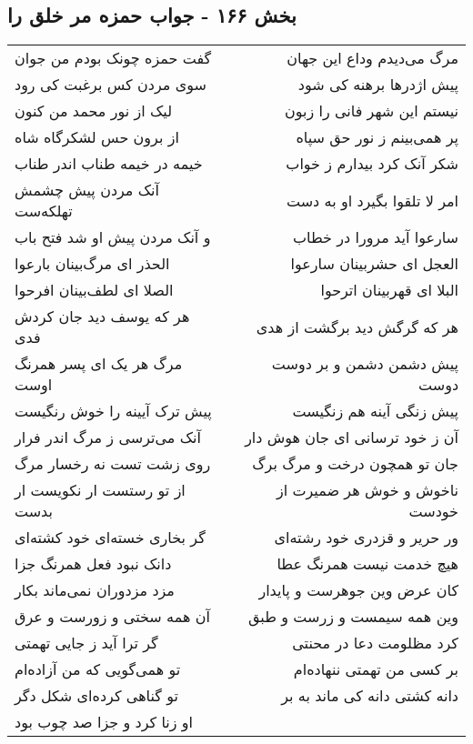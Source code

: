 \begin{center}
\section*{بخش ۱۶۶ - جواب حمزه مر خلق را}
\label{sec:sh166}
\begin{longtable}{l p{0.5cm} r}
گفت حمزه چونک بودم من جوان
&&
مرگ می‌دیدم وداع این جهان
\\
سوی مردن کس برغبت کی رود
&&
پیش اژدرها برهنه کی شود
\\
لیک از نور محمد من کنون
&&
نیستم این شهر فانی را زبون
\\
از برون حس لشکرگاه شاه
&&
پر همی‌بینم ز نور حق سپاه
\\
خیمه در خیمه طناب اندر طناب
&&
شکر آنک کرد بیدارم ز خواب
\\
آنک مردن پیش چشمش تهلکه‌ست
&&
امر لا تلقوا بگیرد او به دست
\\
و آنک مردن پیش او شد فتح باب
&&
سارعوا آید مرورا در خطاب
\\
الحذر ای مرگ‌بینان بارعوا
&&
العجل ای حشربینان سارعوا
\\
الصلا ای لطف‌بینان افرحوا
&&
البلا ای قهربینان اترحوا
\\
هر که یوسف دید جان کردش فدی
&&
هر که گرگش دید برگشت از هدی
\\
مرگ هر یک ای پسر همرنگ اوست
&&
پیش دشمن دشمن و بر دوست دوست
\\
پیش ترک آیینه را خوش رنگیست
&&
پیش زنگی آینه هم زنگیست
\\
آنک می‌ترسی ز مرگ اندر فرار
&&
آن ز خود ترسانی ای جان هوش دار
\\
روی زشت تست نه رخسار مرگ
&&
جان تو همچون درخت و مرگ برگ
\\
از تو رستست ار نکویست ار بدست
&&
ناخوش و خوش هر ضمیرت از خودست
\\
گر بخاری خسته‌ای خود کشته‌ای
&&
ور حریر و قزدری خود رشته‌ای
\\
دانک نبود فعل همرنگ جزا
&&
هیچ خدمت نیست همرنگ عطا
\\
مزد مزدوران نمی‌ماند بکار
&&
کان عرض وین جوهرست و پایدار
\\
آن همه سختی و زورست و عرق
&&
وین همه سیمست و زرست و طبق
\\
گر ترا آید ز جایی تهمتی
&&
کرد مظلومت دعا در محنتی
\\
تو همی‌گویی که من آزاده‌ام
&&
بر کسی من تهمتی ننهاده‌ام
\\
تو گناهی کرده‌ای شکل دگر
&&
دانه کشتی دانه کی ماند به بر
\\
او زنا کرد و جزا صد چوب بود

\end{longtable}
\end{center}

